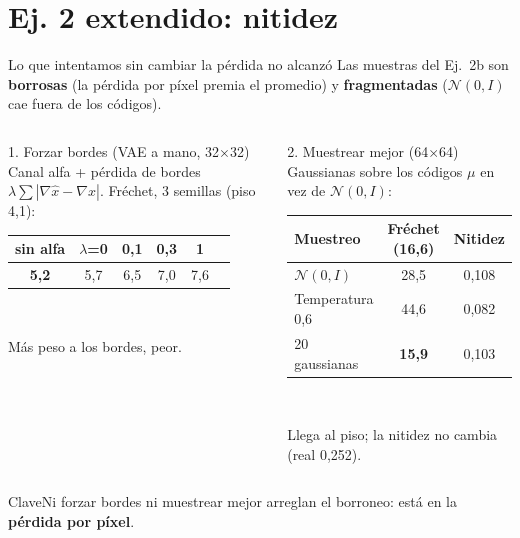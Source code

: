 \documentclass[aspectratio=169]{beamer}
\newcommand{\clave}[1]{%
  \vfill
  \begin{alertblock}{Clave}\footnotesize #1\end{alertblock}}
\begin{document}
\section{Ej. 2 extendido: nitidez}

\begin{frame}{Lo que intentamos sin cambiar la p\'erdida no alcanz\'o}
  \footnotesize
  Las muestras del Ej.\ 2b son \textbf{borrosas} (la p\'erdida por p\'ixel premia el promedio) y \textbf{fragmentadas} ($\mathcal{N}(0,I)$ cae fuera de los c\'odigos).
  \vspace{0.1cm}
  \begin{columns}[T,onlytextwidth]
      \begin{block}{1. Forzar bordes (VAE a mano, 32$\times$32)}
        \scriptsize
        Canal alfa + p\'erdida de bordes $\lambda\sum|\nabla\hat{x}-\nabla x|$. Fr\'echet, 3 semillas (piso 4,1):\\[0.3em]
        \centering\setlength{\tabcolsep}{3pt}
        \begin{tabular}{cccccc}
          \toprule
          sin alfa & $\lambda$=0 & 0,1 & 0,3 & 1 \\
          \midrule
          \textbf{5,2} & 5,7 & 6,5 & 7,0 & 7,6 \\
          \bottomrule
        \end{tabular}\\[0.2em]
        \raggedright M\'as peso a los bordes, peor.
      \end{block}
      \begin{block}{2. Muestrear mejor (64$\times$64)}
        \scriptsize
        Gaussianas sobre los c\'odigos $\mu$ en vez de $\mathcal{N}(0,I)$:\\[0.3em]
        \centering\setlength{\tabcolsep}{3pt}
        \begin{tabular}{lcc}
          \toprule
          Muestreo & Fr\'echet (16,6) & Nitidez \\
          \midrule
          $\mathcal{N}(0,I)$ & 28,5 & 0,108 \\
          Temperatura 0,6 & 44,6 & 0,082 \\
          20 gaussianas & \textbf{15,9} & 0,103 \\
          \bottomrule
        \end{tabular}\\[0.2em]
        \raggedright Llega al piso; la nitidez no cambia (real 0,252).
      \end{block}
  \end{columns}
  \clave{Ni forzar bordes ni muestrear mejor arreglan el borroneo: est\'a en la \textbf{p\'erdida por p\'ixel}.}
\end{frame}
\end{document}
